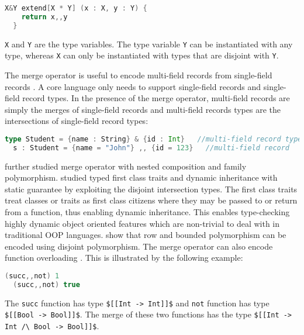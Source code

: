 \begin{lstlisting}[language=Scala]
  X&Y extend[X * Y] (x : X, y : Y) {
    return x,,y
  } 
\end{lstlisting}

\noindent \lstinline{X} and \lstinline{Y} 
are the type variables. The type variable \lstinline{Y} can be instantiated with
any type, whereas \lstinline{X} can only be instantiated
with types that are disjoint with \lstinline{Y}.

The merge operator is useful to encode multi-field records from single-field
records \citep{reynolds1988preliminary}.
A core language only needs to support single-field records
and single-field record types. In the presence of the merge operator,
multi-field records are simply the merges of single-field records and
multi-field records types are the intersections of single-field record
types:

\begin{lstlisting}[language=Scala]
  type Student = {name : String} & {id : Int}   //multi-field record type
  s : Student = {name = "John"} ,, {id = 123}   //multi-field record
\end{lstlisting}

\cite{bi2018essence} further studied merge operator with 
nested composition and family polymorphism.
\cite{bi2018typed} studied typed first class traits and dynamic inheritance
with static guarantee by exploiting the disjoint intersection types. The first class
traits treat classes or traits as first class citizens where they may be
passed to or return from a function, thus enabling dynamic inheritance.
This enables type-checking highly dynamic object oriented features 
which are non-trivial to deal with in traditional OOP languages.
\cite{xie2020row} show that row and bounded polymorphism can be encoded using
disjoint polymorphism. The merge operator can also encode function overloading
\citep{castagna1995calculus,reynolds1988preliminary}.
This is illustrated by the following example:

\begin{lstlisting}[language=Scala]
  (succ,,not) 1
  (succ,,not) true
\end{lstlisting}

\noindent The \lstinline{succ} function has type
\lstinline{$[[Int -> Int]]$} and \lstinline{not}
function has type \lstinline{$[[Bool -> Bool]]$}.
The merge of these two functions has the type 
\lstinline{$[[Int -> Int /\ Bool -> Bool]]$}.

